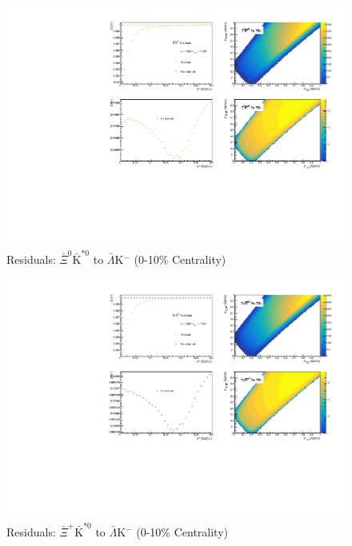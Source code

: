 \documentclass[../AnalysisNoteJBuxton.tex]{subfiles}
\begin{document}
\begin{figure}[h]
  \centering
  \includegraphics[width=\textwidth]{9_AdditionalFigures/Figures/Residuals/ALamKchM/Residuals_ALamKchM_0010_AXi0AKSt0_MomResCrctn_NonFlatBgdCrctn_10Res_PrimMaxDecay4fm_UsingXiDataAndCoulombOnly.pdf}
  \caption[Residuals: $\bar{\Xi}^{0}\bar{\mathrm{K}}^{*0}$ to $\bar{\Lambda}$K$^{-}$ (0-10\% Centrality)]{Residuals: $\bar{\Xi}^{0}\bar{\mathrm{K}}^{*0}$ to $\bar{\Lambda}$K$^{-}$ (0-10\% Centrality)}
  \label{fig:Res_ALamKchM_0010_AXi0AKSt0}
\end{figure}

\begin{figure}[h]
  \centering
  \includegraphics[width=\textwidth]{9_AdditionalFigures/Figures/Residuals/ALamKchM/Residuals_ALamKchM_0010_AXiAKSt0_MomResCrctn_NonFlatBgdCrctn_10Res_PrimMaxDecay4fm_UsingXiDataAndCoulombOnly.pdf}
  \caption[Residuals: $\bar{\Xi}^{+}\bar{\mathrm{K}}^{*0}$ to $\bar{\Lambda}$K$^{-}$ (0-10\% Centrality)]{Residuals: $\bar{\Xi}^{+}\bar{\mathrm{K}}^{*0}$ to $\bar{\Lambda}$K$^{-}$ (0-10\% Centrality)}
  \label{fig:Res_ALamKchM_0010_AXiCAKSt0}
\end{figure}
\end{document}
